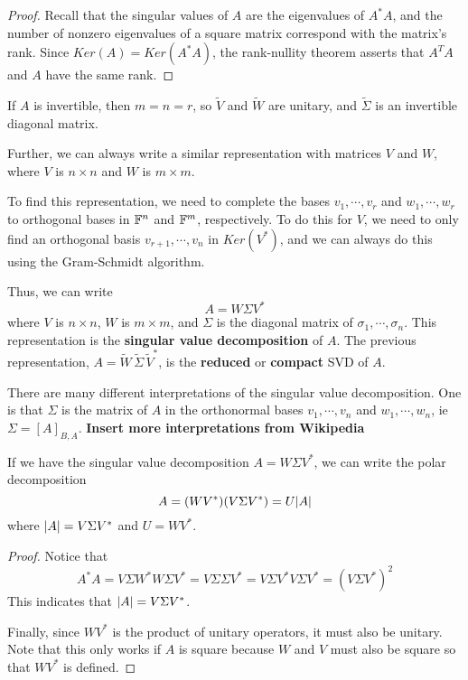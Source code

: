 \begin{proof}
Recall that the singular values of $A$ are the eigenvalues of $A^{*}A$, and the number of nonzero eigenvalues of a square matrix correspond with the matrix's rank.  Since $Ker(A) = Ker(A^{*}A)$, the rank-nullity theorem asserts that $A^{T}A$ and $A$ have the same rank. 
\end{proof}

If $A$ is invertible, then $m = n = r$, so $\widetilde{V}$ and $\widetilde{W}$ are unitary, and $\widetilde{\Sigma}$ is an invertible diagonal matrix. 

Further, we can always write a similar representation with matrices $V$ and $W$, where $V$ is $n \times n$ and $W$ is $m \times m$. 

To find this representation, we need to complete the bases $v_{1}, \cdots, v_{r}$ and $w_{1}, \cdots, w_{r}$ to orthogonal bases in $\mathbb{F}^{n}$ and $\mathbb{F}^{m}$, respectively. To do this for $V$, we need to only find an orthogonal basis $v_{r+1}, \cdots, v_{n}$ in $Ker(V^{*})$, and we can always do this using the Gram-Schmidt algorithm. 

Thus, we can write 
$$A = W \Sigma V^{*}$$
where $V$ is $n \times n$, $W$ is $m \times m$, and $\Sigma$ is the diagonal matrix of $\sigma_{1}, \cdots, \sigma_{n}$. This representation is the \textbf{singular value decomposition} of $A$. The previous representation, $A = \widetilde{W} \, \widetilde{\Sigma} \, \widetilde{V}^{*}$, is the \textbf{reduced} or \textbf{compact} SVD of $A$.

There are many different interpretations of the singular value decomposition. One is that $\Sigma$ is the matrix of $A$ in the orthonormal bases $v_{1}, \cdots, v_{n}$ and $w_{1}, \cdots, w_{n}$, ie $\Sigma = [A]_{B, A}$. \textbf{Insert more interpretations from Wikipedia}

\begin{theorem}
If we have the singular value decomposition $A = W \Sigma V^{*}$, we can write the polar decomposition
$$A = (WV^{*}) (V \Sigma V^{*}) = U \lvert A\rvert$$
where $\lvert A\rvert = V \Sigma V^{*}$ and $U = WV^{*}$. 
\end{theorem}

\begin{proof}
Notice that 
$$A^{*} A = V \Sigma W^{*} W \Sigma V^{*} = V \Sigma \Sigma V^{*} = V \Sigma V^{*} V \Sigma V^{*} = (V \Sigma V^{*})^{2}$$
This indicates that $\lvert A\rvert = V \Sigma V^{*}$. 

Finally, since $WV^{*}$ is the product of unitary operators, it must also be unitary. Note that this only works if $A$ is square because $W$ and $V$ must also be square so that $WV^{*}$ is defined. 
\end{proof}

